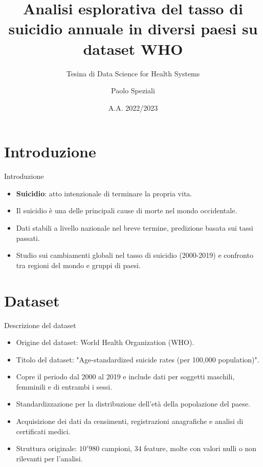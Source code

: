 \documentclass{beamer}
\title{Analisi esplorativa del tasso di suicidio annuale in diversi paesi su dataset WHO}
\subtitle{Tesina di Data Science for Health Systems}
\author{Paolo Speziali}
\institute{Ingegneria Informatica e Robotica \\ Curriculum Data Science}
\date{A.A. 2022/2023}
\begin{document}

\begin{frame}
	\maketitle %
\end{frame}


\section{Introduzione} %


\begin{frame}{Introduzione}
	\begin{itemize}
		\item \textbf{Suicidio}: atto intenzionale di terminare la propria vita.
		\item Il suicidio è una delle principali cause di morte nel mondo occidentale.
		\item Dati stabili a livello nazionale nel breve termine, predizione basata sui tassi passati.
		\item Studio sui cambiamenti globali nel tasso di suicidio (2000-2019) e confronto tra regioni del mondo e gruppi di paesi.
	\end{itemize}
\end{frame}

\section{Dataset} %


\begin{frame}{Descrizione del dataset}
	\begin{itemize}
		\item Origine del dataset: World Health Organization (WHO).
		\item Titolo del dataset: "Age-standardized suicide rates (per 100,000 population)".
		\item Copre il periodo dal 2000 al 2019 e include dati per soggetti maschili, femminili e di entrambi i sessi.
		\item Standardizzazione per la distribuzione dell'età della popolazione del paese.
		\item Acquisizione dei dati da censimenti, registrazioni anagrafiche e analisi di certificati medici.
		\item Struttura originale: $10'980$ campioni, $34$ feature, molte con valori nulli o non rilevanti per l'analisi.
	  \end{itemize}
\end{frame}
\end{document}
